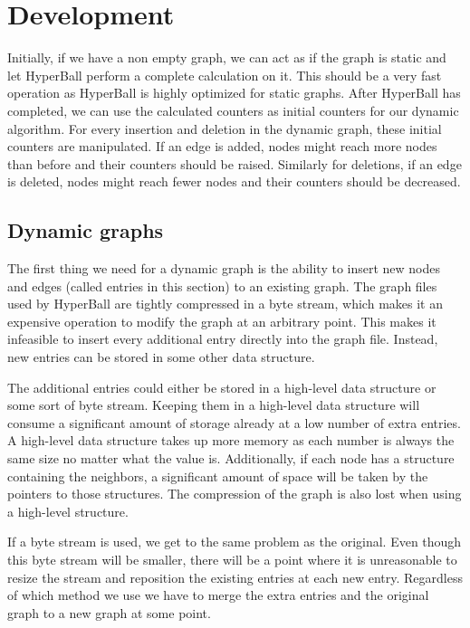 \chapter{Development}

Initially, if we have a non empty graph, we can act as if the graph is static and let HyperBall perform a complete calculation on it. This should be a very fast operation as HyperBall is highly optimized for static graphs. After HyperBall has completed, we can use the calculated counters as initial counters for our dynamic algorithm. For every insertion and deletion in the dynamic graph, these initial counters are manipulated. If an edge is added, nodes might reach more nodes than before and their counters should be raised. Similarly for deletions, if an edge is deleted, nodes might reach fewer nodes and their counters should be decreased. 


\section{Dynamic graphs}

The first thing we need for a dynamic graph is the ability to insert new nodes and edges (called entries in this section) to an existing graph. The graph files used by HyperBall are tightly compressed in a byte stream, which makes it an expensive operation to modify the graph at an arbitrary point. This makes it infeasible to insert every additional entry directly into the graph file. Instead, new entries can be stored in some other data structure.

The additional entries could either be stored in a high-level data structure or some sort of byte stream. Keeping them in a high-level data structure will consume a significant amount of storage already at a low number of extra entries. A high-level data structure takes up more memory as each number is always the same size no matter what the value is. Additionally, if each node has a structure containing the neighbors, a significant amount of space will be taken by the pointers to those structures. The compression of the graph is also lost when using a high-level structure.

If a byte stream is used, we get to the same problem as the original. Even though this byte stream will be smaller, there will be a point where it is unreasonable to resize the stream and reposition the existing entries at each new entry. Regardless of which method we use we have to merge the extra entries and the original graph to a new graph at some point. 

